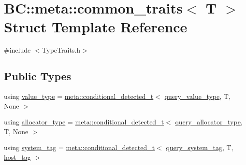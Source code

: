 \hypertarget{structBC_1_1meta_1_1common__traits}{}\section{BC\+:\+:meta\+:\+:common\+\_\+traits$<$ T $>$ Struct Template Reference}
\label{structBC_1_1meta_1_1common__traits}


{\ttfamily \#include $<$Type\+Traits.\+h$>$}

\subsection*{Public Types}
\begin{DoxyCompactItemize}
\item 
using \hyperlink{structBC_1_1meta_1_1common__traits_ad71b54002cc60a73cd2c67226b7cb98a}{value\+\_\+type} = \hyperlink{namespaceBC_1_1meta_a96ed28f49a8ffe8f0bae28da99e6ee18}{meta\+::conditional\+\_\+detected\+\_\+t}$<$ \hyperlink{namespaceBC_1_1meta_a36503419befa65fc6e75a98b507337d7}{query\+\_\+value\+\_\+type}, T, None $>$
\item 
using \hyperlink{structBC_1_1meta_1_1common__traits_a73f9e44fada565af730b3d70fbc355d2}{allocator\+\_\+type} = \hyperlink{namespaceBC_1_1meta_a96ed28f49a8ffe8f0bae28da99e6ee18}{meta\+::conditional\+\_\+detected\+\_\+t}$<$ \hyperlink{namespaceBC_1_1meta_ab8436259bffb6e3c72b402744e6dc707}{query\+\_\+allocator\+\_\+type}, T, None $>$
\item 
using \hyperlink{structBC_1_1meta_1_1common__traits_ac0343c0340c4ac5bec82d0ba7248038d}{system\+\_\+tag} = \hyperlink{namespaceBC_1_1meta_a96ed28f49a8ffe8f0bae28da99e6ee18}{meta\+::conditional\+\_\+detected\+\_\+t}$<$ \hyperlink{namespaceBC_1_1meta_a4c0dfe841ff90bea709f1289cb3718ea}{query\+\_\+system\+\_\+tag}, T, \hyperlink{structBC_1_1host__tag}{host\+\_\+tag} $>$
\end{DoxyCompactItemize}
